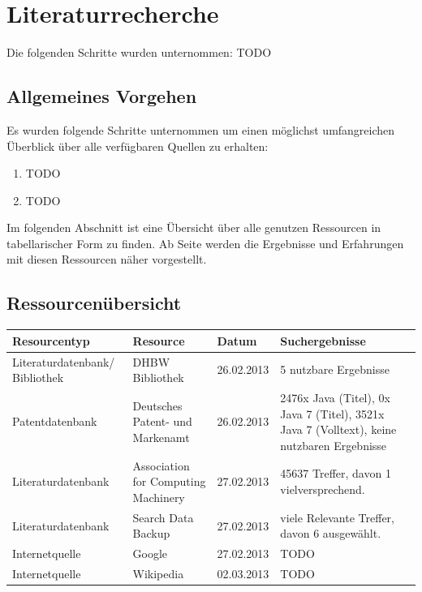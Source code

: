 \section{Literaturrecherche}
Die folgenden Schritte wurden unternommen: TODO

\subsection{Allgemeines Vorgehen}

Es wurden folgende Schritte unternommen um einen möglichst umfangreichen Überblick über alle verfügbaren Quellen zu erhalten:
\begin{enumerate}
\item TODO
\item TODO
\end{enumerate}
Im folgenden Abschnitt ist eine Übersicht über alle genutzen Ressourcen in tabellarischer Form zu finden. Ab Seite \pageref{startdetails} werden die Ergebnisse und Erfahrungen mit diesen Ressourcen näher vorgestellt.

\subsection{Ressourcenübersicht}

\renewcommand{\arraystretch}{1.5}
\begin{table}[htp]
\centering
\begin{tabular}{p{3.6cm}|p{3.5cm}|l|p{3.5cm}}
Resourcentyp & Resource & Datum & Suchergebnisse\\
\hline
Literaturdatenbank/ Bibliothek & DHBW Bibliothek & 26.02.2013 & 5 nutzbare Ergebnisse\\
Patentdatenbank & Deutsches Patent- und Markenamt & 26.02.2013 & 2476x Java (Titel), 0x Java 7 (Titel), 3521x Java 7 (Volltext), keine nutzbaren Ergebnisse\\
Literaturdatenbank & Association for Computing Machinery & 27.02.2013 & 45637 Treffer, davon 1 vielversprechend.\\
Literaturdatenbank & Search Data Backup & 27.02.2013 & viele Relevante Treffer, davon 6 ausgewählt.\\
Internetquelle & Google & 27.02.2013 & TODO\\
Internetquelle & Wikipedia & 02.03.2013 & TODO\\
\end{tabular}
\end{table}
\renewcommand{\arraystretch}{1}

